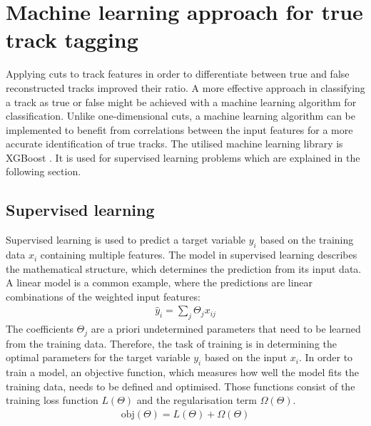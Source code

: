 \chapter{Machine learning approach for true track tagging}
Applying cuts to track features in order to differentiate between true and false reconstructed tracks improved their ratio. A more effective
approach in classifying a track as true or false might be achieved with a machine learning algorithm for classification.
Unlike one-dimensional cuts, a machine learning
algorithm can be implemented to benefit from correlations between the input features for a more accurate identification of true tracks. The utilised
machine learning library is XGBoost \cite{xgboost}. It is used for supervised learning problems \cite{supervised} which are explained in the following section.

\section{Supervised learning}
Supervised learning is used to predict a target variable $y_i$ based on the training data $x_i$ containing multiple features. The model
in supervised learning describes the mathematical structure, which determines the prediction from its input data.
A linear model is a common example, where the predictions
are linear combinations of the weighted input features:
\begin{align}
  \hat{y}_i = \sum_j \Theta_j x_{ij}
\end{align}
The coefficients $\Theta_j$ are a priori undetermined parameters that need to be learned from the training data.
Therefore, the task of training is in determining the optimal parameters
for the target variable $y_i$ based on the input $x_i$. In order to train a model, an objective function, which measures how well
the model fits the training data, needs to be defined and optimised.
Those functions consist of the training loss function $L(\Theta) $ and the regularisation term $\Omega (\Theta)$.
\begin{align}
  \text{obj}(\Theta) = L(\Theta) + \Omega(\Theta)
\end{align}

